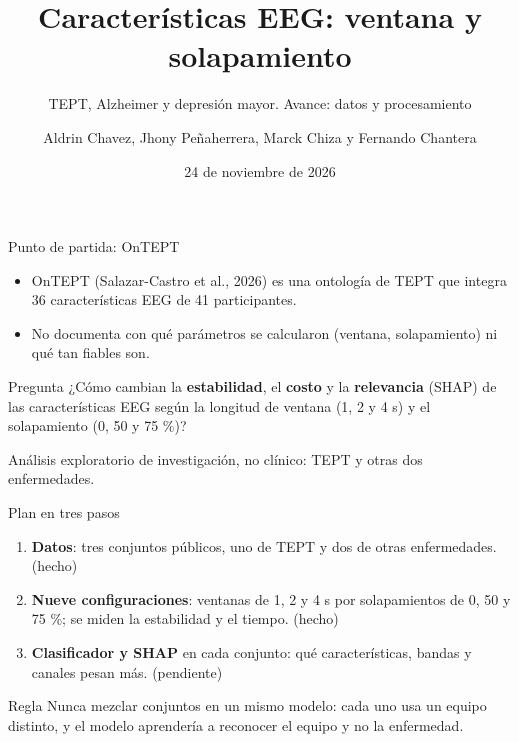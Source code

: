 \documentclass[aspectratio=169,11pt]{beamer}
\title{Características EEG: ventana y solapamiento}
\subtitle{TEPT, Alzheimer y depresión mayor. Avance: datos y procesamiento}
\author{Aldrin Chavez, Jhony Peñaherrera, Marck Chiza y Fernando Chantera}
\date{24 de noviembre de 2026}
\begin{document}
\maketitle

\begin{frame}{Punto de partida: OnTEPT}
  \begin{itemize}
    \item OnTEPT (Salazar-Castro et al., 2026) es una ontología de TEPT que integra \alert{36 características EEG} de 41 participantes.
    \item No documenta \alert{con qué parámetros} se calcularon (ventana, solapamiento) ni \alert{qué tan fiables} son.
  \end{itemize}
  \vspace{4mm}
  \begin{block}{Pregunta}
    ¿Cómo cambian la \textbf{estabilidad}, el \textbf{costo} y la \textbf{relevancia} (SHAP) de las características EEG según la longitud de ventana (1, 2 y 4 s) y el solapamiento (0, 50 y 75 \%)?
  \end{block}
  \vspace{3mm}
  {\small Análisis exploratorio de investigación, no clínico: TEPT y otras dos enfermedades.}
\end{frame}

\begin{frame}{Plan en tres pasos}
  \begin{enumerate}
    \item \textbf{Datos}: tres conjuntos públicos, uno de TEPT y dos de otras enfermedades. (\alert{hecho})
    \item \textbf{Nueve configuraciones}: ventanas de 1, 2 y 4 s por solapamientos de 0, 50 y 75 \%; se miden la estabilidad y el tiempo. (\alert{hecho})
    \item \textbf{Clasificador y SHAP} en cada conjunto: qué características, bandas y canales pesan más. (pendiente)
  \end{enumerate}
  \vspace{5mm}
  \begin{alertblock}{Regla}
    Nunca mezclar conjuntos en un mismo modelo: cada uno usa un equipo distinto, y el modelo aprendería a reconocer el equipo y no la enfermedad.
  \end{alertblock}
\end{frame}
\end{document}
